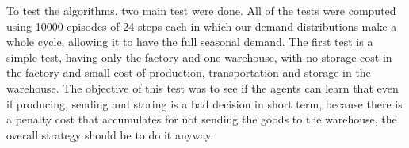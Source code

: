 \documentclass[journal, a4paper]{IEEEtran}
\theoremstyle{plain}
\theoremstyle{definition}
\begin{document}
To test the algorithms, two main test were done. All of the tests were computed using 10000 episodes of 24 steps each in which our demand distributions make a whole cycle, allowing it to have the full seasonal demand.\newline
The first test is a simple test, having only the factory and one warehouse,  with no storage cost in the factory and small cost of production, transportation and storage in the warehouse. The objective of this test was to see if the agents can learn that even if producing, sending and storing is a bad decision in short term, because there is a penalty cost that accumulates for not sending the goods to the warehouse, the overall strategy should be to do it anyway.
\end{document}
